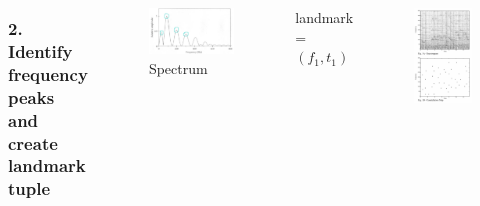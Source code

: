 \documentclass{beamer}
\begin{document}
\begin{frame}
\begin{columns}
\frametitle{2. Identify frequency peaks and create landmark tuple}
\begin{figure}
\includegraphics[scale=0.1]{pngs/05_spektrum.png} 
\caption{Spectrum}
\end{figure}
\begin{center}
landmark = $(f_1, t_1)$\\
\end{center}
\begin{figure}
\includegraphics[scale=0.14]{pngs/06_spektrogramm.png} 

\end{figure}
\end{columns}
\end{frame}
\end{document}
